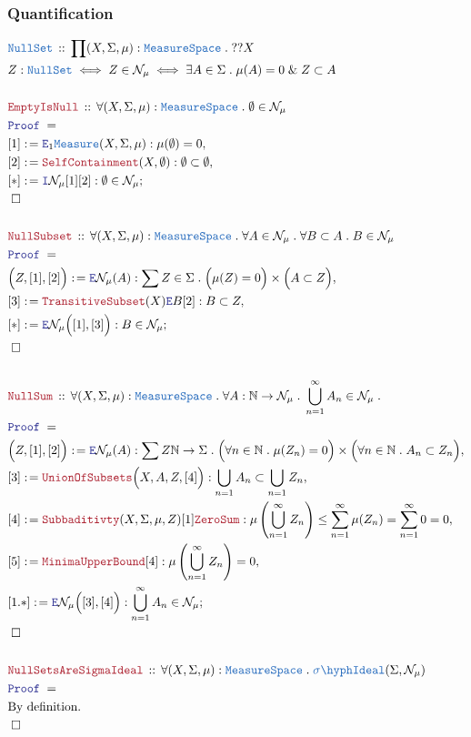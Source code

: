 \documentclass[12pt]{scrartcl}
\newcommand{\TYPE}[1]{\textcolor{NavyBlue}{\mathtt{#1}}}
\newcommand{\LOGIC}[1]{\textcolor{Blue}{\mathtt{#1}}}
\newcommand{\THM}[1]{\textcolor{Maroon}{\mathtt{#1}}}
\renewcommand{\.}{\; . \;}
\newcommand{\de}{: \kern 0.1pc =}
\newcommand{\Theorem}[2]{& \THM{#1} \, :: \, #2 \\ & \Proof = \\ }
\newcommand{\DeclareType}[2]{& \TYPE{#1} \, :: \, #2 \\}
\newcommand{\DefineNamedType}[4]{& #1 : \TYPE{#2} \iff #3 \iff #4 \\}
\newcommand{\Page}[1]{ \begin{align*} #1 \end{align*}   }
\renewcommand{\And}{\; \& \;}
\newcommand{\Intro}{\LOGIC{I}}
\newcommand{\Elim}{\LOGIC{E}}
\newcommand{\Nat}{\mathbb{N} }
\newcommand{\Say}[3]{& #1 \de #2 : #3, \\}
\newcommand{\Conclude}[3]{& #1 \de #2 : #3; \\}
\newcommand{\QED}{\; \square}
\newcommand{\EndProof}{& \QED \\}
\newcommand{\Proof}{\LOGIC{Proof} \; }
\newcommand{\Explain}[1]{& \text{#1.} \\}
\newcommand{\Ideal}{\TYPE{Ideal}}
\newcommand{\SIdeal}{\TYPE{\sigma\hyph \Ideal}}
\newcommand{\Measure}{\TYPE{Measure}}
\newcommand{\MS}{\TYPE{MeasureSpace}}
\newcommand{\Null}{\mathcal{N}}
\begin{document}
\subsubsection{Quantification}
\Page{
	\DeclareType{NullSet}{\prod (X,\Sigma,\mu) : \MS \. ??X}
	\DefineNamedType{Z}{NullSet}{Z \in \Null_\mu}
	{
		\exists A \in \Sigma \. \mu(A) = 0 \And Z \subset A	
	}
	\\
	\Theorem{EmptyIsNull}
	{
		\forall (X,\Sigma,\mu) : \MS \.
		\emptyset \in \Null_\mu
	}
	\Say{[1]}{\Elim_1 \Measure(X,\Sigma,\mu)}{\mu(\emptyset)=0}
	\Say{[2]}{\THM{SelfContainment}(X,\emptyset)}{\emptyset \subset \emptyset}
	\Conclude{[*]}{\Intro \Null_\mu [1][2]}{\emptyset \in \Null_\mu}
	\EndProof
	\\
	\Theorem{NullSubset}
	{
		\forall (X,\Sigma,\mu) : \MS \.
		\forall A \in \Null_\mu \.
		\forall B \subset A \.
		B \in \Null_\mu
	}
	\Say{\Big(Z,[1],[2]\Big)}{\Elim \Null_\mu(A)}{
		\sum Z \in \Sigma \.   \Big(\mu(Z) = 0 \Big)\times\Big( A \subset Z \Big)	
	}
	\Say{[3]}{\THM{TransitiveSubset}(X) \Elim B [2]}
	{
		B \subset Z
	}
	\Conclude{[*]}{\Elim \Null_\mu\Big([1], [3]\Big)}
	{
		B \in \Null_\mu
	}
	\EndProof
	\\
	\Theorem{NullSum}
	{
		\forall (X,\Sigma,\mu) : \MS \.
		\forall A : \Nat \to \Null_\mu \.
		\bigcup^\infty_{n=1} A_n \in \Null_\mu \.
	}
	\Say{\Big(Z,[1],[2]\Big)}{\Elim \Null_\mu(A)}{
		\sum Z \Nat \to \Sigma \.   \Big( \forall n \in \Nat \. \mu(Z_n) = 0 \Big)
		\times\Big( \forall n \in \Nat \. A_n \subset Z_n \Big)	
	}
	\Say{[3]}{\THM{UnionOfSubsets}\Big(X,A,Z,[4]\Big)}
	{
		\bigcup_{n=1} A_n \subset \bigcup_{n=1} Z_n
	}
	\Say{[4]}{\THM{Subbaditivty}(X,\Sigma,\mu,Z)[1]\THM{ZeroSum}}
	{
		\mu\left(\bigcup^\infty_{n=1} Z_n\right) \le	
		\sum^\infty_{n=1} \mu(Z_n) =
		\sum^\infty_{n=1} 0 =
		0	
	}
	\Say{[5]}{\THM{MinimaUpperBound}[4]}
	{
		\mu\left(\bigcup^\infty_{n=1} Z_n\right) = 0
	}
	\Conclude{[1.*]}{\Elim \Null_\mu\Big( [3], [4] \Big)}
	{
		\bigcup^\infty_{n=1} A_n \in \Null_\mu
	}
	\EndProof
	\\
	\Theorem{NullSetsAreSigmaIdeal}
	{
		\forall (X,\Sigma,\mu) : \MS \. 
		\SIdeal(\Sigma,\Null_\mu)
	}
	\Explain{By definition}
	\EndProof
}
\end{document}
